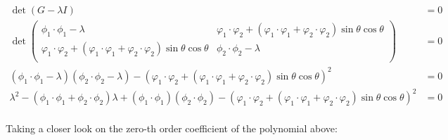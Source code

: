 \documentclass{article}[a4]
\begin{document}
\begin{align*}
\det (G - \lambda I) &= 0 \\
\det \begin{pmatrix}
\phi_1 \cdot \phi_1 - \lambda & \varphi_1\cdot\varphi_2 + \left( \varphi_1\cdot\varphi_1 + \varphi_2\cdot\varphi_2 \right) \sin \theta \cos \theta \\
\varphi_1\cdot\varphi_2 + \left( \varphi_1\cdot\varphi_1 + \varphi_2\cdot\varphi_2 \right) \sin \theta \cos \theta & \phi_2 \cdot \phi_2 - \lambda \\
\end{pmatrix} &= 0 \\
\left( \phi_1 \cdot \phi_1 - \lambda \right)\left( \phi_2 \cdot \phi_2 - \lambda \right) - \left( \varphi_1\cdot\varphi_2 + \left( \varphi_1\cdot\varphi_1 + \varphi_2\cdot\varphi_2 \right) \sin \theta \cos \theta \right)^2 &= 0 \\
\lambda^2 - \left( \phi_1 \cdot \phi_1 + \phi_2 \cdot \phi_2 \right) \lambda + \left( \phi_1 \cdot \phi_1 \right)\left( \phi_2 \cdot \phi_2 \right) - \left( \varphi_1\cdot\varphi_2 + \left( \varphi_1\cdot\varphi_1 + \varphi_2\cdot\varphi_2 \right) \sin \theta \cos \theta \right)^2 &= 0 \\
\end{align*}

Taking a closer look on the zero-th order coefficient of the polynomial above:
\end{document}
